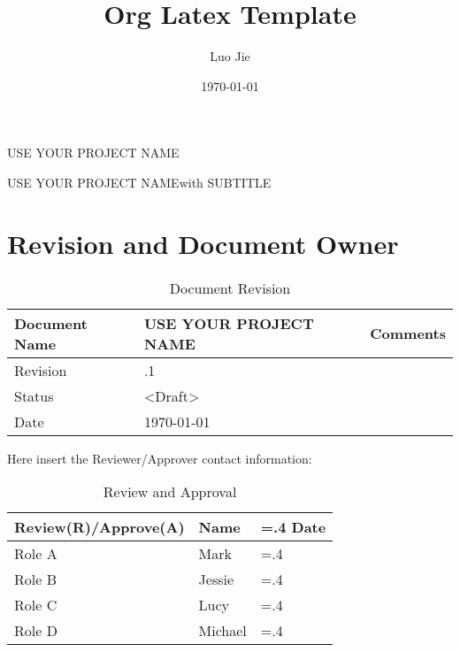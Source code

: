 \documentclass[letterpaper, 11pt]{article}
\author{Luo Jie}
\date{\today}
\title{Org Latex Template}
\newcommand{\projectname}{USE YOUR PROJECT NAME}
\newcommand{\documentversion}{0.0.1}
\begin{document}
\begin{center}
{\LARGE \projectname  \\}
\end{center}

\begin{center}
{\LARGE \projectname with SUBTITLE}
\end{center}


\pagebreak[4]
\tableofcontents
\pagebreak[4]
\listoffigures
\pagebreak[4]
\section{Revision and Document Owner}
\label{sec:orgc178992}

\begin{table}[ht]
\begin{center}
\begin{tabularx}{0.8\textwidth} {
  | >{\raggedright\arraybackslash}X
  | >{\centering\arraybackslash}X
  | >{\raggedleft\arraybackslash}X | }
 \hline
 Document Name & \projectname & Comments \\
 \hline
 Revision  & \documentversion  &   \\
\hline
Status & <Draft> & \\
\hline
Date & \today & \\
\hline
\end{tabularx}
\caption{Document Revision}
\end{center}
\end{table}

Here insert the Reviewer/Approver contact information:
\begin{table}[ht]
\begin{center}
\begin{tabularx}{1\textwidth} {
  | >{\raggedright\arraybackslash\hsize=1.3\hsize}X
  | >{\raggedright\arraybackslash\hsize=1.3\hsize}X
  | >{\raggedright\arraybackslash\hsize=.4\hsize}X | }
\hline
 Review(R)/Approve(A) & Name & Date \\\hline\hline
 Role A  & Mark   &   \\\hline
 Role B & Jessie  & \\\hline
 Role C & Lucy  & \\\hline
 Role D & Michael  & \\\hline
\end{tabularx}
\caption{Review and Approval}
\end{center}
\end{table}
\end{document}
